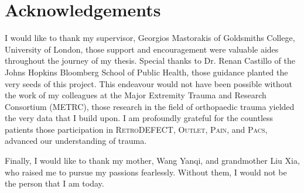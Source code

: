\chapter{Acknowledgements}

I would like to thank my supervisor, Georgios Mastorakis of Goldsmiths College, University of London, those support and encouragement were valuable aides throughout the journey of my thesis.
Special thanks to Dr. Renan Castillo of the Johns Hopkins Bloomberg School of Public Health, those guidance planted the very seeds of this project.
This endeavour would not have been possible without the work of my colleagues at the Major Extremity Trauma and Research Consortium (METRC), those research in the field of orthopaedic trauma yielded the very data that I build upon.
I am profoundly grateful for the countless patients those participation in \textsc{RetroDEFECT}, \textsc{Outlet}, \textsc{Pain}, and \textsc{Pacs}, advanced our understanding of trauma.

Finally, I would like to thank my mother, Wang Yanqi, and grandmother Liu Xia, who raised me to pursue my passions fearlessly. Without them, I would not be the person that I am today.